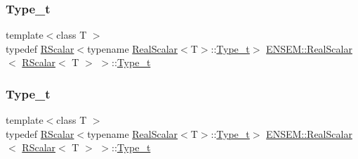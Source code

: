 \subsubsection{\texorpdfstring{Type\_t}{Type\_t}\hspace{0.1cm}{\footnotesize\ttfamily [1/3]}}
{\footnotesize\ttfamily template$<$class T $>$ \\
typedef \mbox{\hyperlink{classENSEM_1_1RScalar}{R\+Scalar}}$<$typename \mbox{\hyperlink{structENSEM_1_1RealScalar}{Real\+Scalar}}$<$T$>$\+::\mbox{\hyperlink{structENSEM_1_1RealScalar_3_01RScalar_3_01T_01_4_01_4_a98fef60a69ef8b4856721a6f7b115ce5}{Type\+\_\+t}}$>$ \mbox{\hyperlink{structENSEM_1_1RealScalar}{E\+N\+S\+E\+M\+::\+Real\+Scalar}}$<$ \mbox{\hyperlink{classENSEM_1_1RScalar}{R\+Scalar}}$<$ T $>$ $>$\+::\mbox{\hyperlink{structENSEM_1_1RealScalar_3_01RScalar_3_01T_01_4_01_4_a98fef60a69ef8b4856721a6f7b115ce5}{Type\+\_\+t}}}

\mbox{\label{structENSEM_1_1RealScalar_3_01RScalar_3_01T_01_4_01_4_a98fef60a69ef8b4856721a6f7b115ce5}} 
\subsubsection{\texorpdfstring{Type\_t}{Type\_t}\hspace{0.1cm}{\footnotesize\ttfamily [2/3]}}
{\footnotesize\ttfamily template$<$class T $>$ \\
typedef \mbox{\hyperlink{classENSEM_1_1RScalar}{R\+Scalar}}$<$typename \mbox{\hyperlink{structENSEM_1_1RealScalar}{Real\+Scalar}}$<$T$>$\+::\mbox{\hyperlink{structENSEM_1_1RealScalar_3_01RScalar_3_01T_01_4_01_4_a98fef60a69ef8b4856721a6f7b115ce5}{Type\+\_\+t}}$>$ \mbox{\hyperlink{structENSEM_1_1RealScalar}{E\+N\+S\+E\+M\+::\+Real\+Scalar}}$<$ \mbox{\hyperlink{classENSEM_1_1RScalar}{R\+Scalar}}$<$ T $>$ $>$\+::\mbox{\hyperlink{structENSEM_1_1RealScalar_3_01RScalar_3_01T_01_4_01_4_a98fef60a69ef8b4856721a6f7b115ce5}{Type\+\_\+t}}}

\mbox{\label{structENSEM_1_1RealScalar_3_01RScalar_3_01T_01_4_01_4_a98fef60a69ef8b4856721a6f7b115ce5}} 
